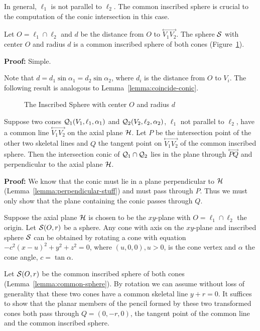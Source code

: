      In general, $\ell_1$ is not parallel to $\ell_2$.  The common
inscribed sphere is crucial to the computation of the conic intersection
in this case.

\begin{lemma}
\label{lemma:common-sphere}
     Let $O=\ell_1\cap\ell_2$ and $d$ be the distance from $O$ to
$\stackrel{\longleftrightarrow}{V_1V_2}$.  The sphere ${\cal S}$ with center
$O$ and radius $d$ is a common inscribed sphere of both cones
(Figure~\ref{fig:inscribed-sphere}).
\end{lemma}
{\bf Proof:}  Simple. \QED

     Note that $d=d_1\sin\alpha_1=d_2\sin\alpha_2$, where $d_i$ is the
distance from $O$ to $V_i$.
The following result is analogous to Lemma~\ref{lemma:coincide-conic}.

\begin{figure}
\vspace{4.5cm}
\caption{The Inscribed Sphere with center $O$ and radius $d$}
\label{fig:inscribed-sphere}
\end{figure}

\begin{theorem}
\label{theorem:double-line}
     Suppose two cones ${\cal Q}_1(V_1,\ell_1,\alpha_1)$ and
${\cal Q}_2(V_2,\ell_2,\alpha_2)$, $\ell_1$ not parallel to $\ell_2$,
have a common line $\stackrel{\longleftrightarrow}{V_1V_2}$ on the axial plane
${\cal H}$.  Let $P$ be the intersection point of the other two skeletal lines
and $Q$ the tangent point on $\stackrel{\longleftrightarrow}{V_1V_2}$ of the
common inscribed sphere.  Then the intersection conic of
${\cal Q}_1\cap{\cal Q}_2$ lies in the plane through
$\stackrel{\longleftrightarrow}{PQ}$ and perpendicular to the axial plane
${\cal H}$.
\end{theorem}
{\bf Proof:}  We know that the conic must lie in a plane
perpendicular to ${\cal H}$ (Lemma~\ref{lemma:perpendicular-stuff})
and must pass through $P$.  Thus we must only show that the plane
containing the conic passes through $Q$.

     Suppose the axial plane ${\cal H}$ is chosen to be the $xy$-plane with
$O=\ell_1\cap\ell_2$ the origin.  Let ${\cal S}(O,r)$ be a sphere.
Any cone with axis on the $xy$-plane and inscribed sphere ${\cal S}$ can
be obtained by rotating a  cone with equation
$-c^2(x-u)^2+y^2+z^2=0$, where $(u,0,0), u>0$, is the cone vertex and
$\alpha$ the cone angle, $c=\tan\alpha$.

     Let ${\cal S}(O,r)$ be the common inscribed sphere of both cones
(Lemma~\ref{lemma:common-sphere}).  By rotation we can assume without loss of
generality that these two cones have a common skeletal line $y+r=0$.
It suffices to show that the planar members of the pencil
formed by these two transformed cones both pass through
$Q=(0,-r,0)$, the tangent point of the common line and the common inscribed
sphere.

